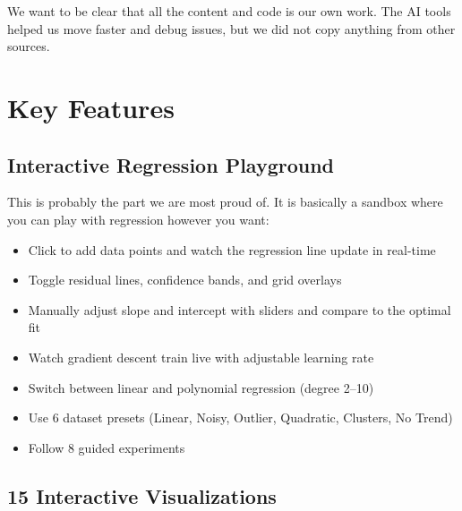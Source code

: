 \documentclass[12pt, a4paper]{article}
\begin{document}
We want to be clear that all the content and code is our own work. The AI tools helped us move faster and debug issues, but we did not copy anything from other sources.

\section{Key Features}
\label{sec:features}

\subsection{Interactive Regression Playground}

This is probably the part we are most proud of. It is basically a sandbox where you can play with regression however you want:
\begin{itemize}
    \item Click to add data points and watch the regression line update in real-time
    \item Toggle residual lines, confidence bands, and grid overlays
    \item Manually adjust slope and intercept with sliders and compare to the optimal fit
    \item Watch gradient descent train live with adjustable learning rate
    \item Switch between linear and polynomial regression (degree 2--10)
    \item Use 6 dataset presets (Linear, Noisy, Outlier, Quadratic, Clusters, No Trend)
    \item Follow 8 guided experiments
\end{itemize}

\subsection{15 Interactive Visualizations}
\end{document}
